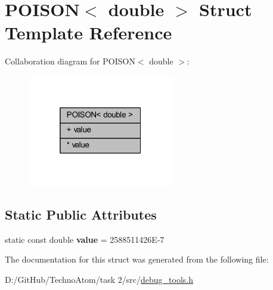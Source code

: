 \hypertarget{struct_p_o_i_s_o_n_3_01double_01_4}{}\section{P\+O\+I\+S\+ON$<$ double $>$ Struct Template Reference}
\label{struct_p_o_i_s_o_n_3_01double_01_4}


Collaboration diagram for P\+O\+I\+S\+ON$<$ double $>$\+:
\nopagebreak
\begin{figure}[H]
\begin{center}
\leavevmode
\includegraphics[width=181pt]{struct_p_o_i_s_o_n_3_01double_01_4__coll__graph}
\end{center}
\end{figure}
\subsection*{Static Public Attributes}
\textbf{ }\par
\begin{DoxyCompactItemize}
\item 
\mbox{\label{struct_p_o_i_s_o_n_3_01double_01_4_aa06e0aac29e46b6fc449dfddad0bba91}} 
static const double {\bfseries value} = 2588511426\+E-\/7
\end{DoxyCompactItemize}



The documentation for this struct was generated from the following file\+:\begin{DoxyCompactItemize}
\item 
D\+:/\+Git\+Hub/\+Techno\+Atom/task 2/src/\hyperlink{debug__tools_8h}{debug\+\_\+tools.\+h}\end{DoxyCompactItemize}
